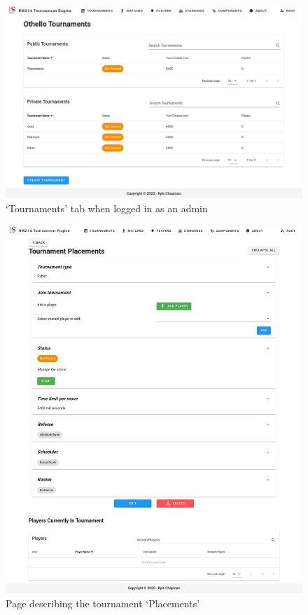 \documentclass[a4paper, 12pt]{report}
\begin{document}
\begin{figure}[H]
	\centering
	\includegraphics[scale=0.33]{all-tournaments-admin.png}
	\caption{`Tournaments' tab when logged in as an admin}
	\label{fig:all-tourn-admin}
\end{figure}
\begin{figure}[H]
	\centering
	\includegraphics[scale=0.37]{tournaments-admin.png}
	\caption{Page describing the tournament `Placements'}
	\label{fig:tourn-placements}
\end{figure}
\end{document}
